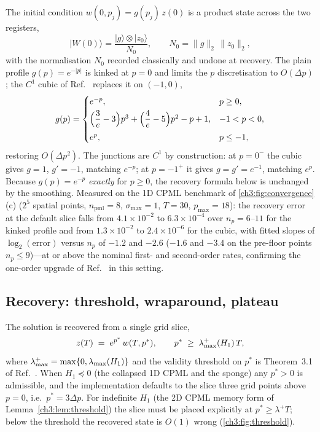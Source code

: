 The initial condition $w(0,p_j) = g(p_j)\,z(0)$ is a product state across
the two registers,
\begin{equation}
  \lvert W(0)\rangle
  = \frac{\lvert g\rangle \otimes \lvert z_0\rangle}{N_0},
  \qquad
  N_0 = \lVert g\rVert_2\,\lVert z_0\rVert_2,
  \label{ch3:appC:product}
\end{equation}
with the normalisation $N_0$ recorded classically and undone at recovery.
The plain profile $g(p) = e^{-\lvert p\rvert}$ is kinked at $p=0$ and
limits the $p$ discretisation to $O(\Delta p)$; the $C^{1}$ cubic of
Ref.~\cite[Remark~4.9]{jin2024recovery} replaces it on $(-1,0)$,
\begin{equation}
  g(p) =
  \begin{cases}
    e^{-p}, & p \ge 0,\\[3pt]
    \Bigl(\dfrac{3}{e}-3\Bigr)p^{3}
      + \Bigl(\dfrac{4}{e}-5\Bigr)p^{2} - p + 1, & -1 < p < 0,\\[7pt]
    e^{p}, & p \le -1,
  \end{cases}
  \label{ch3:appC:profile}
\end{equation}
restoring $O(\Delta p^{2})$.  The junctions are $C^{1}$ by construction:
at $p=0^{-}$ the cubic gives $g=1$, $g'=-1$, matching $e^{-p}$; at
$p=-1^{+}$ it gives $g = g' = e^{-1}$, matching $e^{p}$.  Because
$g(p) = e^{-p}$ \emph{exactly} for $p\ge0$, the recovery formula below is
unchanged by the smoothing.  Measured on the 1D CPML benchmark of
\ref{ch3:fig:convergence}(c) ($2^{5}$ spatial points,
$n_{\mathrm{pml}}=8$, $\sigma_{\max}=1$, $T=30$, $p_{\max}=18$): the
recovery error at the default slice falls from $4.1\times10^{-2}$ to
$6.3\times10^{-4}$ over $n_p = 6$--$11$ for the kinked profile and from
$1.3\times10^{-2}$ to $2.4\times10^{-6}$ for the cubic, with fitted
slopes of $\log_2(\mathrm{error})$ versus $n_p$ of $-1.2$ and $-2.6$
($-1.6$ and $-3.4$ on the pre-floor points $n_p\le9$)---at or above the
nominal first- and second-order rates, confirming the one-order upgrade
of Ref.~\cite{jin2024recovery} in this setting.

\subsection{Recovery: threshold, wraparound, plateau}
\label{ch3:appC:recovery}

The solution is recovered from a single grid slice,
\begin{equation}
  z(T) \;=\; e^{p^{*}}\,w(T,p^{*}),
  \qquad
  p^{*} \;\ge\; \lamax^{+}(H_1)\,T,
  \label{ch3:appC:recover}
\end{equation}
where $\lambda_{\max}^{+} = \max\{0,\lambda_{\max}(H_1)\}$ and the validity threshold on
$p^{*}$ is Theorem~3.1 of Ref.~\cite{jin2024recovery}.  When
$H_1\preceq0$ (the collapsed 1D CPML and the sponge) any $p^{*}>0$ is
admissible, and the implementation defaults to the slice three grid
points above $p=0$, i.e.\ $p^{*} = 3\Delta p$.  For indefinite $H_1$ (the
2D CPML memory form of Lemma~\ref{ch3:lem:threshold}) the slice must be
placed explicitly at $p^{*}\ge\lambda^{+}T$; below the threshold the
recovered state is $O(1)$ wrong (\ref{ch3:fig:threshold}).

